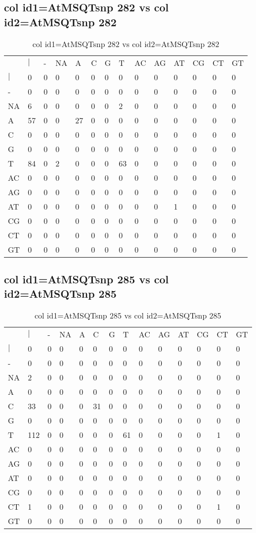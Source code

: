 \subsection{col id1=AtMSQTsnp 282 vs col id2=AtMSQTsnp 282}
\begin{center}
\begin{longtable}{|l|l|l|l|l|l|l|l|l|l|l|l|l|l|}
\caption{col id1=AtMSQTsnp 282 vs col id2=AtMSQTsnp 282} \label{table_dm622}\\
\hline
\\
\hline
&$|$&-&NA&A&C&G&T&AC&AG&AT&CG&CT&GT\\
$|$&0&0&0&0&0&0&0&0&0&0&0&0&0\\
-&0&0&0&0&0&0&0&0&0&0&0&0&0\\
NA&6&0&0&0&0&0&2&0&0&0&0&0&0\\
A&57&0&0&27&0&0&0&0&0&0&0&0&0\\
C&0&0&0&0&0&0&0&0&0&0&0&0&0\\
G&0&0&0&0&0&0&0&0&0&0&0&0&0\\
T&84&0&2&0&0&0&63&0&0&0&0&0&0\\
AC&0&0&0&0&0&0&0&0&0&0&0&0&0\\
AG&0&0&0&0&0&0&0&0&0&0&0&0&0\\
AT&0&0&0&0&0&0&0&0&0&1&0&0&0\\
CG&0&0&0&0&0&0&0&0&0&0&0&0&0\\
CT&0&0&0&0&0&0&0&0&0&0&0&0&0\\
GT&0&0&0&0&0&0&0&0&0&0&0&0&0\\
\hline
\end{longtable}
\end{center}

\subsection{col id1=AtMSQTsnp 285 vs col id2=AtMSQTsnp 285}
\begin{center}
\begin{longtable}{|l|l|l|l|l|l|l|l|l|l|l|l|l|l|}
\caption{col id1=AtMSQTsnp 285 vs col id2=AtMSQTsnp 285} \label{table_dm624}\\
\hline
\\
\hline
&$|$&-&NA&A&C&G&T&AC&AG&AT&CG&CT&GT\\
$|$&0&0&0&0&0&0&0&0&0&0&0&0&0\\
-&0&0&0&0&0&0&0&0&0&0&0&0&0\\
NA&2&0&0&0&0&0&0&0&0&0&0&0&0\\
A&0&0&0&0&0&0&0&0&0&0&0&0&0\\
C&33&0&0&0&31&0&0&0&0&0&0&0&0\\
G&0&0&0&0&0&0&0&0&0&0&0&0&0\\
T&112&0&0&0&0&0&61&0&0&0&0&1&0\\
AC&0&0&0&0&0&0&0&0&0&0&0&0&0\\
AG&0&0&0&0&0&0&0&0&0&0&0&0&0\\
AT&0&0&0&0&0&0&0&0&0&0&0&0&0\\
CG&0&0&0&0&0&0&0&0&0&0&0&0&0\\
CT&1&0&0&0&0&0&0&0&0&0&0&1&0\\
GT&0&0&0&0&0&0&0&0&0&0&0&0&0\\
\hline
\end{longtable}
\end{center}

